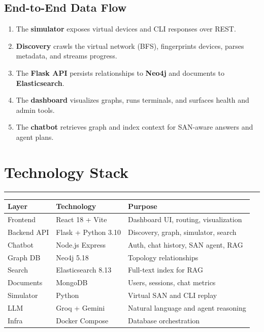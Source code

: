 \documentclass[11pt,a4paper]{article}
\begin{document}
\subsection{End-to-End Data Flow}

\begin{enumerate}[leftmargin=1.5cm]
    \item The \textbf{simulator} exposes virtual devices and CLI responses over REST.
    \item \textbf{Discovery} crawls the virtual network (BFS), fingerprints devices, parses metadata, and streams progress.
    \item The \textbf{Flask API} persists relationships to \textbf{Neo4j} and documents to \textbf{Elasticsearch}.
    \item The \textbf{dashboard} visualizes graphs, runs terminals, and surfaces health and admin tools.
    \item The \textbf{chatbot} retrieves graph and index context for SAN-aware answers and agent plans.
\end{enumerate}


\section{Technology Stack}

\vspace{0.3cm}\hrule\vspace{0.6cm}

\begin{longtable}{p{4cm} p{4cm} p{5cm}}
\toprule
\rowcolor{headerbg}
\textbf{Layer} & \textbf{Technology} & \textbf{Purpose} \\
\midrule
Frontend & React 18 + Vite & Dashboard UI, routing, visualization \\
Backend API & Flask + Python 3.10 & Discovery, graph, simulator, search \\
Chatbot & Node.js Express & Auth, chat history, SAN agent, RAG \\
Graph DB & Neo4j 5.18 & Topology relationships \\
Search & Elasticsearch 8.13 & Full-text index for RAG \\
Documents & MongoDB & Users, sessions, chat metrics \\
Simulator & Python & Virtual SAN and CLI replay \\
LLM & Groq + Gemini & Natural language and agent reasoning \\
Infra & Docker Compose & Database orchestration \\
\bottomrule
\end{longtable}
\end{document}
